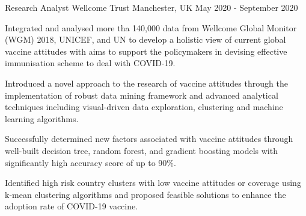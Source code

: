 

\begin{cventries}

  \cventry
    {Research Analyst} %
    {Wellcome Trust} %
    {Manchester, UK} %
    {May 2020 - September 2020} %
    {
      \begin{cvitems} %
        \item {Integrated and analysed more tha 140,000 data from Wellcome Global Monitor (WGM) 2018, UNICEF, and UN to develop a holistic view of current global vaccine attitudes with aims to support the policymakers in devising effective immunisation scheme to deal with COVID-19.}
        \item {Introduced a novel approach to the research of vaccine attitudes through the implementation of robust data mining framework and advanced analytical techniques including visual-driven data exploration, clustering and machine learning algorithms.}
        \item {Successfully determined new factors associated with vaccine attitudes through well-built decision tree, random forest, and gradient boosting models with significantly high accuracy score of up to 90\%.}
        \item {Identified high risk country clusters with low vaccine attitudes or coverage using k-mean clustering algorithms and proposed feasible solutions to enhance the adoption rate of COVID-19 vaccine.}
      \end{cvitems}
    }


\end{cventries}
